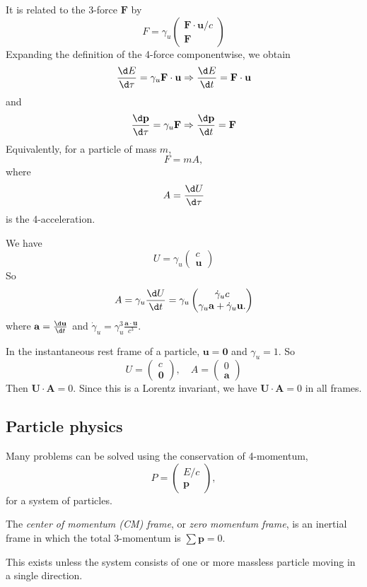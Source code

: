 \documentclass[a4paper]{article}
\begin{document}
It is related to the 3-force $\mathbf{F}$ by
\[
  F = \gamma_u
  \begin{pmatrix}
    \mathbf{F}\cdot \mathbf{u}/c\\
    \mathbf{F}
  \end{pmatrix}
\]
Expanding the definition of the 4-force componentwise, we obtain
\[
  \frac{\d E}{\d \tau} = \gamma_u \mathbf{F}\cdot \mathbf{u} \Rightarrow \frac{\d E}{\d t} = \mathbf{F}\cdot \mathbf{u}
\]
and
\[
  \frac{\d \mathbf{p}}{\d \tau} = \gamma_u \mathbf{F} \Rightarrow \frac{\d \mathbf{p}}{\d t} = \mathbf{F}
\]
Equivalently, for a particle of mass $m$,
\[
  F =mA,
\]
where
\[
  A = \frac{\d U}{\d \tau}
\]
is the 4-acceleration.

We have
\[
  U = \gamma_u
  \begin{pmatrix}
    c\\
    \mathbf{u}
  \end{pmatrix}
\]
So
\[
  A = \gamma_u \frac{\d U}{\d t} = \gamma_u
  \begin{pmatrix}
    \dot{\gamma}_u c\\
    \gamma_u \mathbf{a} + \dot{\gamma}_u \mathbf{u}.
  \end{pmatrix}
\]
where $\mathbf{\mathbf{a}} = \frac{\d \mathbf{u}}{\d t}$ and $\dot{\gamma}_u = \gamma_u^3 \frac{\mathbf{a}\cdot \mathbf{u}}{c^3}$.

In the instantaneous rest frame of a particle, $\mathbf{u} = \mathbf{0}$ and $\gamma_u = 1$. So
\[
  U =
  \begin{pmatrix}
    c\\
    \mathbf{0}
  \end{pmatrix}, \quad
  A =
  \begin{pmatrix}
    0\\
    \mathbf{a}
  \end{pmatrix}
\]
Then $\mathbf{U}\cdot \mathbf{A} = 0$. Since this is a Lorentz invariant, we have $\mathbf{U} \cdot \mathbf{A} = 0$ in all frames.

\subsection{Particle physics}
Many problems can be solved using the conservation of 4-momentum,
\[
  P =
  \begin{pmatrix}
    E/c\\
    \mathbf{p}
  \end{pmatrix},
\]
for a system of particles.
\begin{defi}
  The \emph{center of momentum (CM) frame}, or \emph{zero momentum frame}, is an inertial frame in which the total 3-momentum is $\sum \mathbf{p} = 0$.
\end{defi}
This exists unless the system consists of one or more massless particle moving in a single direction.
\end{document}
